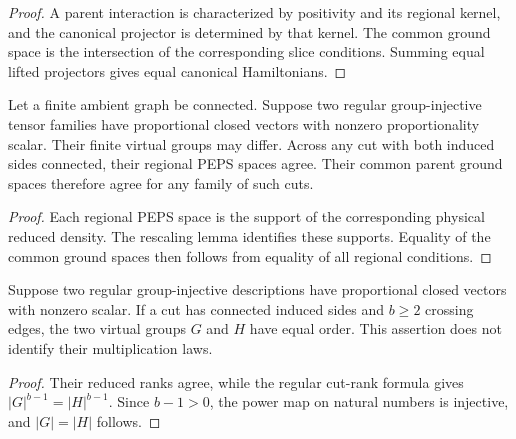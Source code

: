 \begin{proof}\leanok
    A parent interaction is characterized by positivity and its
    regional kernel, and the canonical projector is determined
    by that kernel. The common ground space is the intersection
    of the corresponding slice conditions. Summing equal lifted
    projectors gives equal canonical Hamiltonians.
\end{proof}

\begin{corollary}%
    \label{thm:peps_regular_parent_spaces_physical_ray}
    \leanok
    Let a finite ambient graph be connected. Suppose two regular
    group-injective tensor families have proportional closed
    vectors with nonzero proportionality scalar. Their finite
    virtual groups may differ. Across any cut with both induced
    sides connected, their regional PEPS spaces agree. Their
    common parent ground spaces therefore agree for any family
    of such cuts.
\end{corollary}

\begin{proof}\leanok
    Each regional PEPS space is the support of the corresponding
    physical reduced density. The rescaling lemma identifies
    these supports. Equality of the common ground spaces then
    follows from equality of all regional conditions.
\end{proof}

\begin{corollary}%
    \label{thm:peps_regular_group_order_physical_ray}
    \leanok
    Suppose two regular group-injective descriptions have
    proportional closed vectors with nonzero scalar. If a cut
    has connected induced sides and $b\geq2$ crossing edges,
    the two virtual groups $G$ and $H$ have equal order.
    This assertion does not identify their multiplication laws.
\end{corollary}

\begin{proof}\leanok
    Their reduced ranks agree, while the regular cut-rank formula
    gives $|G|^{b-1}=|H|^{b-1}$. Since $b-1>0$, the power map
    on natural numbers is injective, and $|G|=|H|$ follows.
\end{proof}
